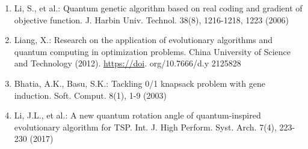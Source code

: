 \documentclass[10pt]{article}
\begin{document}
\begin{enumerate}
  \item Li, S., et al.: Quantum genetic algorithm based on real coding and gradient of objective function. J. Harbin Univ. Technol. 38(8), 1216-1218, 1223 (2006)

  \item Liang, X.: Research on the application of evolutionary algorithms and quantum computing in optimization problems. China University of Science and Technology (2012). \href{https://doi}{https://doi}. org/10.7666/d.y 2125828

  \item Bhatia, A.K., Basu, S.K.: Tackling 0/1 knapsack problem with gene induction. Soft. Comput. 8(1), 1-9 (2003)

  \item Li, J.L., et al.: A new quantum rotation angle of quantum-inspired evolutionary algorithm for TSP. Int. J. High Perform. Syst. Arch. 7(4), 223-230 (2017)

\end{enumerate}
\end{document}
